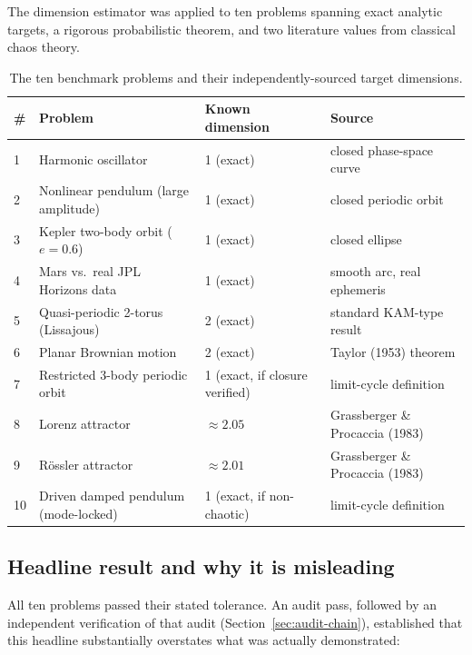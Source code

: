 \documentclass[11pt,a4paper]{article}
\begin{document}
The dimension estimator was applied to ten problems spanning exact
analytic targets, a rigorous probabilistic theorem, and two literature
values from classical chaos theory.

\begin{table}[h]
\centering
\small
\begin{tabular}{@{}llll@{}}
\toprule
\# & Problem & Known dimension & Source \\
\midrule
1 & Harmonic oscillator & 1 (exact) & closed phase-space curve \\
2 & Nonlinear pendulum (large amplitude) & 1 (exact) & closed periodic orbit \\
3 & Kepler two-body orbit ($e=0.6$) & 1 (exact) & closed ellipse \\
4 & Mars vs.\ real JPL Horizons data & 1 (exact) & smooth arc, real ephemeris \\
5 & Quasi-periodic 2-torus (Lissajous) & 2 (exact) & standard KAM-type result \\
6 & Planar Brownian motion & 2 (exact) & Taylor (1953) theorem \\
7 & Restricted 3-body periodic orbit & 1 (exact, if closure verified) & limit-cycle definition \\
8 & Lorenz attractor & $\approx 2.05$ & Grassberger \& Procaccia (1983) \\
9 & R\"ossler attractor & $\approx 2.01$ & Grassberger \& Procaccia (1983) \\
10 & Driven damped pendulum (mode-locked) & 1 (exact, if non-chaotic) & limit-cycle definition \\
\bottomrule
\end{tabular}
\caption{The ten benchmark problems and their independently-sourced target dimensions.}
\end{table}

\subsection{Headline result and why it is misleading}

All ten problems passed their stated tolerance. An audit pass, followed by
an independent verification of that audit (Section~\ref{sec:audit-chain}),
established that this headline substantially overstates what was actually
demonstrated:
\end{document}

